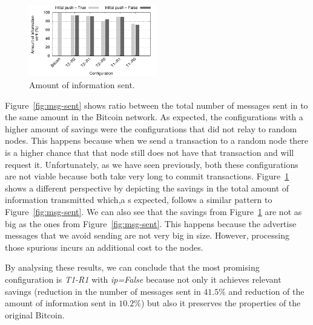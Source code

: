 \documentclass{dads}   %
\begin{document}
\begin{figure}[t]
\centering
\includegraphics[width=0.5\textwidth]{plots/mb-sent.pdf}
\caption{Amount of information sent.}
\label{fig:mb-sent}
\end{figure}

Figure~\ref{fig:msg-sent} shows ratio between the total number of messages sent in to the same amount in the Bitcoin network. As expected, the configurations with a higher amount of savings were the configurations that did not relay to random nodes. This happens because when we send a transaction to a random node there is a higher chance that that node still does not have that transaction and will request it. Unfortunately, as we have seen previously, both these configurations are not viable because both take very long to commit transactions. Figure~\ref{fig:mb-sent} shows a different perspective by depicting the savings in the total amount of information transmitted which,a s expected, follows a similar pattern to Figure~\ref{fig:msg-sent}. We can also see that the savings from Figure~\ref{fig:mb-sent} are not as big as the ones from Figure~\ref{fig:msg-sent}.
This happens because the advertise messages that we avoid sending are not very big in size. However, processing those spurious incurs an additional cost to the nodes.

By analysing these results, we can conclude that the most promising configuration is \textsl{T1-R1} with \textsl{ip=False} because not only  it achieves relevant savings (reduction in the number of messages sent in $41.5\%$ and reduction of the amount of information sent in $10.2\%$) but also it preserves the properties of the original Bitcoin.
\end{document}
